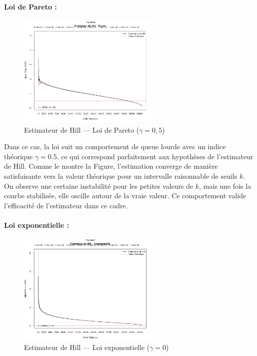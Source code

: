 \documentclass{article}
\begin{document}
\paragraph{Loi de Pareto :}
\begin{figure}[H]
    \centering
    \includegraphics[width=0.6\textwidth]{./images/hill_pareto.png}
    \caption{Estimateur de Hill — Loi de Pareto ($\gamma = 0{,}5$)}
\end{figure}

Dans ce cas, la loi suit un comportement de queue lourde avec un indice théorique $\gamma = 0.5$, ce qui correspond parfaitement aux hypothèses de l’estimateur de Hill. Comme le montre la Figure, l’estimation converge de manière satisfaisante vers la valeur théorique pour un intervalle raisonnable de seuils $k$. On observe une certaine instabilité pour les petites valeurs de $k$, mais une fois la courbe stabilisée, elle oscille autour de la vraie valeur. Ce comportement valide l'efficacité de l’estimateur dans ce cadre.
\paragraph{Loi exponentielle :}
\begin{figure}[H]
    \centering
    \includegraphics[width=0.6\textwidth]{./images/hill_expo.png}
    \caption{Estimateur de Hill — Loi exponentielle ($\gamma = 0$)}
\end{figure}
\end{document}
